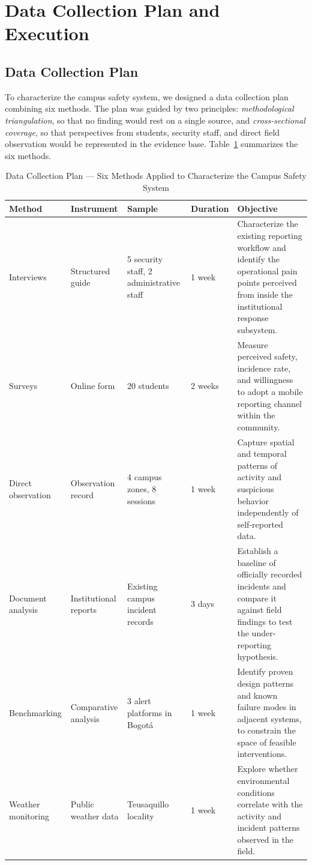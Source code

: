 \documentclass[conference]{IEEEtran}
\begin{document}
\section{Data Collection Plan and Execution}
\label{sec:datacollection}

\subsection{Data Collection Plan}
To characterize the campus safety system, we designed a data
collection plan combining six methods. The plan was guided by two
principles: \emph{methodological triangulation}, so that no finding
would rest on a single source, and \emph{cross-sectional coverage},
so that perspectives from students, security staff, and direct
field observation would be represented in the evidence base.
Table~\ref{tab:datamethods} summarizes the six methods.

\begin{table}[t]
\caption{Data Collection Plan --- Six Methods Applied to Characterize the Campus Safety System}
\label{tab:datamethods}
\centering
\renewcommand{\arraystretch}{1.2}
\begin{tabular}{p{2.4cm}p{2.4cm}p{2.6cm}p{1.6cm}p{6.8cm}}
\toprule
\textbf{Method} & \textbf{Instrument} & \textbf{Sample} & \textbf{Duration} & \textbf{Objective} \\
\midrule
Interviews & Structured guide & 5 security staff, 2 administrative staff & 1 week &
Characterize the existing reporting workflow and identify the operational pain points perceived from inside the institutional response subsystem. \\
Surveys & Online form & 20 students & 2 weeks &
Measure perceived safety, incidence rate, and willingness to adopt a mobile reporting channel within the community. \\
Direct observation & Observation record & 4 campus zones, 8 sessions & 1 week &
Capture spatial and temporal patterns of activity and suspicious behavior independently of self-reported data. \\
Document analysis & Institutional reports & Existing campus incident records & 3 days &
Establish a baseline of officially recorded incidents and compare it against field findings to test the under-reporting hypothesis. \\
Benchmarking & Comparative analysis & 3 alert platforms in Bogot\'a & 1 week &
Identify proven design patterns and known failure modes in adjacent systems, to constrain the space of feasible interventions. \\
Weather monitoring & Public weather data & Teusaquillo locality & 1 week &
Explore whether environmental conditions correlate with the activity and incident patterns observed in the field. \\
\bottomrule
\end{tabular}
\end{table}
\end{document}
